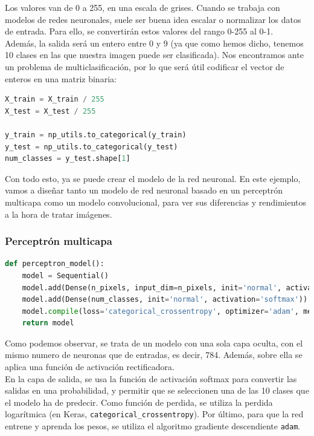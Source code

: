Los valores van de 0 a 255, en una escala de grises. Cuando se trabaja con modelos de redes neuronales, suele ser buena idea escalar o normalizar los datos de entrada. Para ello, se convertirán estos valores del rango 0-255 al 0-1.\\
Además, la salida será un entero entre 0 y 9 (ya que como hemos dicho, tenemos 10 clases en las que nuestra imagen puede ser clasificada). Nos encontramos ante un problema de multiclasificación, por lo que será útil codificar el vector de enteros en una matriz binaria:
\begin{lstlisting}[language=Python]
X_train = X_train / 255
X_test = X_test / 255

y_train = np_utils.to_categorical(y_train)
y_test = np_utils.to_categorical(y_test)
num_classes = y_test.shape[1]
\end{lstlisting}

Con todo esto, ya se puede crear el modelo de la red neuronal. En este ejemplo, vamos a diseñar tanto un modelo de red neuronal basado en un perceptrón multicapa como un modelo convolucional, para ver sus diferencias y rendimientos a la hora de tratar imágenes.
\subsubsection{Perceptrón multicapa}
\begin{lstlisting}[language=Python]
def perceptron_model():
	model = Sequential()
	model.add(Dense(n_pixels, input_dim=n_pixels, init='normal', activation='relu'))
	model.add(Dense(num_classes, init='normal', activation='softmax'))
	model.compile(loss='categorical_crossentropy', optimizer='adam', metrics=['accuracy'])
	return model
\end{lstlisting}
Como podemos observar, se trata de un modelo con una sola capa oculta, con el mismo numero de neuronas que de entradas, es decir, 784. Además, sobre ella se aplica una función de activación rectificadora.\\
En la capa de salida, se usa la función de activación softmax para convertir las salidas en una probabilidad, y permitir que se seleccionen una de las 10 clases que el modelo ha de predecir. Como función de perdida, se utiliza la perdida logarítmica (en Keras, \lstinline{categorical_crossentropy}). Por último, para que la red entrene y aprenda los pesos, se utiliza el algoritmo gradiente descendiente \lstinline{adam}.\\

